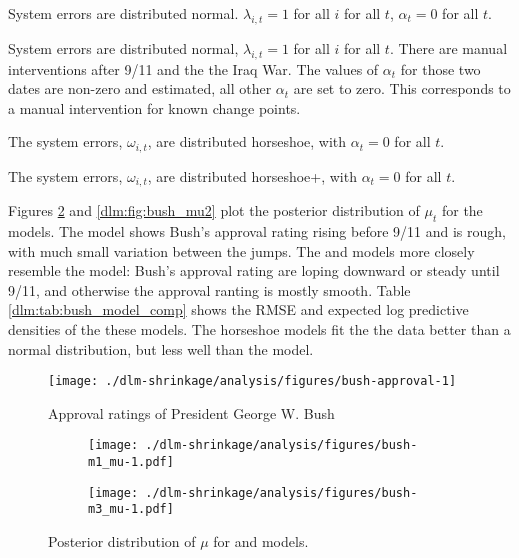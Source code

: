 \documentclass[12pt]{article}
\begin{document}
\begin{description}[font = \normalfont\ModelII]
\item[Normal]
  System errors are distributed normal.
  $\lambda_{i, t} = 1$  for all $i$ for all $t$, $\alpha_{t} = 0$ for all $t$.
\item[Intervention]
  System errors are distributed normal, $\lambda_{i, t} = 1$  for all $i$ for all $t$.
  There are manual interventions after 9/11 and the the Iraq War.
  The values of $\alpha_{t}$ for those two dates are non-zero and estimated, all other $\alpha_{t}$ are set to zero.
  This corresponds to a manual intervention for known change points.
\item[Horseshoe] The system errors, $\omega_{i,t}$, are distributed horseshoe, with $\alpha_{t} = 0$ for all $t$.
\item[Horseshoe+] The system errors, $\omega_{i,t}$, are distributed horseshoe+, with  $\alpha_{t}= 0$ for all $t$.
\end{description}


Figures \ref{dlm:fig:bush_mu1} and \ref{dlm:fig:bush_mu2} plot the posterior distribution of $\mu_{t}$ for the models.
The  model shows Bush's approval rating rising before 9/11 and is rough, with much small variation between the jumps.
The  and  models more closely resemble the  model:
Bush's approval rating are loping downward or steady until 9/11, and otherwise the approval ranting is mostly smooth.
Table \ref{dlm:tab:bush_model_comp} shows the RMSE and expected log predictive densities of the these models.
The horseshoe models fit the the data better than a normal distribution, but less well than the  model.

\begin{figure}[thbp!]
  \centering
  \texttt{[image: ./dlm-shrinkage/analysis/figures/bush-approval-1]}
  \caption{Approval ratings of President George W. Bush}
  \label{dlm:fig:bush_approval}
\end{figure}

\begin{figure}[thbp!]
  \centering
  \begin{subfigure}[b]{\linewidth}
    \texttt{[image: ./dlm-shrinkage/analysis/figures/bush-m1\_mu-1.pdf]}
    \caption{}
  \end{subfigure}

  \begin{subfigure}[b]{\linewidth}
    \texttt{[image: ./dlm-shrinkage/analysis/figures/bush-m3\_mu-1.pdf]}
    \caption{}
  \end{subfigure}
  \caption{Posterior distribution of $\mu$ for  and  models.}
  \label{dlm:fig:bush_mu1}
\end{figure}
\end{document}

